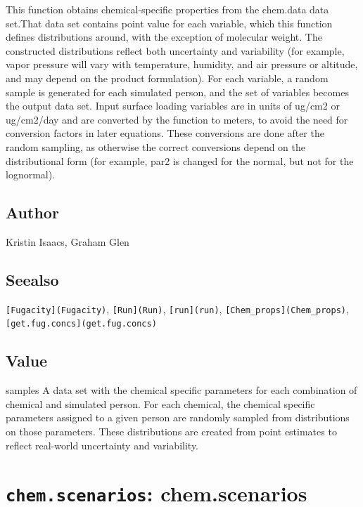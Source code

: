 \documentclass[
]{article}
\begin{document}
This function obtains chemical-specific properties from the chem.data
data set.That data set contains point value for each variable, which
this function defines distributions around, with the exception of
molecular weight. The constructed distributions reflect both uncertainty
and variability (for example, vapor pressure will vary with temperature,
humidity, and air pressure or altitude, and may depend on the product
formulation). For each variable, a random sample is generated for each
simulated person, and the set of variables becomes the output data set.
Input surface loading variables are in units of ug/cm2 or ug/cm2/day and
are converted by the function to meters, to avoid the need for
conversion factors in later equations. These conversions are done after
the random sampling, as otherwise the correct conversions depend on the
distributional form (for example, par2 is changed for the normal, but
not for the lognormal).

\hypertarget{author-4}{%
\subsection{Author}\label{author-4}}

Kristin Isaacs, Graham Glen

\hypertarget{seealso-4}{%
\subsection{Seealso}\label{seealso-4}}

\texttt{{[}Fugacity{]}(Fugacity)}, \texttt{{[}Run{]}(Run)},
\texttt{{[}run{]}(run)}, \texttt{{[}Chem\_props{]}(Chem\_props)},
\texttt{{[}get.fug.concs{]}(get.fug.concs)}

\hypertarget{value-4}{%
\subsection{Value}\label{value-4}}

samples A data set with the chemical specific parameters for each
combination of chemical and simulated person. For each chemical, the
chemical specific parameters assigned to a given person are randomly
sampled from distributions on those parameters. These distributions are
created from point estimates to reflect real-world uncertainty and
variability.

\hypertarget{chem.scenarios-chem.scenarios}{%
\section{\texorpdfstring{\texttt{chem.scenarios}:
chem.scenarios}{chem.scenarios: chem.scenarios}}\label{chem.scenarios-chem.scenarios}}
\end{document}
